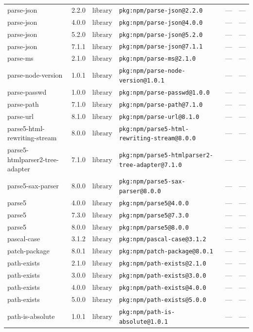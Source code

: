 \documentclass[11pt]{article}
\begin{document}
\begin{longtable}{|l|l|l|p{2.2cm}|l|p{4cm}|}
parse-json & 2.2.0 & library & \texttt{pkg:npm/parse-json@2.2.0} & — & — \\
parse-json & 4.0.0 & library & \texttt{pkg:npm/parse-json@4.0.0} & — & — \\
parse-json & 5.2.0 & library & \texttt{pkg:npm/parse-json@5.2.0} & — & — \\
parse-json & 7.1.1 & library & \texttt{pkg:npm/parse-json@7.1.1} & — & — \\
parse-ms & 2.1.0 & library & \texttt{pkg:npm/parse-ms@2.1.0} & — & — \\
parse-node-version & 1.0.1 & library & \texttt{pkg:npm/parse-node-version@1.0.1} & — & — \\
parse-passwd & 1.0.0 & library & \texttt{pkg:npm/parse-passwd@1.0.0} & — & — \\
parse-path & 7.1.0 & library & \texttt{pkg:npm/parse-path@7.1.0} & — & — \\
parse-url & 8.1.0 & library & \texttt{pkg:npm/parse-url@8.1.0} & — & — \\
parse5-html-rewriting-stream & 8.0.0 & library & \texttt{pkg:npm/parse5-html-rewriting-stream@8.0.0} & — & — \\
parse5-htmlparser2-tree-adapter & 7.1.0 & library & \texttt{pkg:npm/parse5-htmlparser2-tree-adapter@7.1.0} & — & — \\
parse5-sax-parser & 8.0.0 & library & \texttt{pkg:npm/parse5-sax-parser@8.0.0} & — & — \\
parse5 & 4.0.0 & library & \texttt{pkg:npm/parse5@4.0.0} & — & — \\
parse5 & 7.3.0 & library & \texttt{pkg:npm/parse5@7.3.0} & — & — \\
parse5 & 8.0.0 & library & \texttt{pkg:npm/parse5@8.0.0} & — & — \\
pascal-case & 3.1.2 & library & \texttt{pkg:npm/pascal-case@3.1.2} & — & — \\
patch-package & 8.0.1 & library & \texttt{pkg:npm/patch-package@8.0.1} & — & — \\
path-exists & 2.1.0 & library & \texttt{pkg:npm/path-exists@2.1.0} & — & — \\
path-exists & 3.0.0 & library & \texttt{pkg:npm/path-exists@3.0.0} & — & — \\
path-exists & 4.0.0 & library & \texttt{pkg:npm/path-exists@4.0.0} & — & — \\
path-exists & 5.0.0 & library & \texttt{pkg:npm/path-exists@5.0.0} & — & — \\
path-is-absolute & 1.0.1 & library & \texttt{pkg:npm/path-is-absolute@1.0.1} & — & — \\

\end{longtable}
\end{document}
